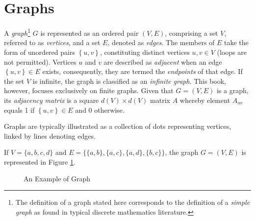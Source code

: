 %
%

\section{Graphs}
\label{sec:Graphs}

A \emph{graph}\footnote{The definition of a graph stated here corresponds to the definition of a \emph{simple graph} as found in typical discrete mathematics literature.} $G$ is represented as an ordered pair $(V,E)$, comprising a set $V$, referred to as \emph{vertices}, and a set $E$, denoted as \emph{edges}. The members of $E$ take the form of unordered pairs $\left\{ u,v\right\}$, constituting distinct vertices $u,v\in V$ (loops are not permitted). Vertices $u$ and $v$ are described as \emph{adjacent} when an edge $\left\{ u,v\right\} \in E$ exists, consequently, they are termed the \emph{endpoints} of that edge. If the set $V$ is infinite, the graph is classified as an \emph{infinite graph}. This book, however, focuses exclusively on finite graphs. Given that $G = (V,E)$ is a graph, its \emph{adjacency matrix} is a square $d(V) \times d(V)$ matrix $A$ whereby element $A_{uv}$ equals 1 if $\left\{ u,v\right\} \in E$ and 0 otherwise.

Graphs are typically illustrated as a collection of dots representing vertices, linked by lines denoting edges.

\begin{example}
\label{ex:binary_tree}
If $V=\{a, b, c, d\}$ and $E=\{ \{a,b\}, \{a,c\}, \{a,d\}, \{b,c\} \}$, the graph $G=(V,E)$ is represented in Figure \ref{fig:Graph-Example}.
\end{example}

\begin{figure}[t]
\centering
{}
\caption{\label{fig:Graph-Example}An Example of Graph}
\end{figure}

